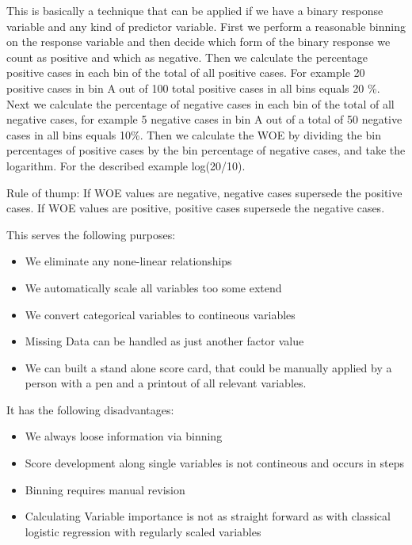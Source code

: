 \documentclass[
  letterpaper,
  DIV=11,
  numbers=noendperiod]{scrreprt}
\providecommand{\tightlist}{%
  \setlength{\itemsep}{0pt}\setlength{\parskip}{0pt}}\usepackage{longtable,booktabs,array}
\begin{document}
This is basically a technique that can be applied if we have a binary
response variable and any kind of predictor variable. First we perform a
reasonable binning on the response variable and then decide which form
of the binary response we count as positive and which as negative. Then
we calculate the percentage positive cases in each bin of the total of
all positive cases. For example 20 positive cases in bin A out of 100
total positive cases in all bins equals 20 \%. Next we calculate the
percentage of negative cases in each bin of the total of all negative
cases, for example 5 negative cases in bin A out of a total of 50
negative cases in all bins equals 10\%. Then we calculate the WOE by
dividing the bin percentages of positive cases by the bin percentage of
negative cases, and take the logarithm. For the described example
log(20/10).

Rule of thump: If WOE values are negative, negative cases supersede the
positive cases. If WOE values are positive, positive cases supersede the
negative cases.

This serves the following purposes:

\begin{itemize}
\tightlist
\item
  We eliminate any none-linear relationships
\item
  We automatically scale all variables too some extend
\item
  We convert categorical variables to contineous variables
\item
  Missing Data can be handled as just another factor value
\item
  We can built a stand alone score card, that could be manually applied
  by a person with a pen and a printout of all relevant variables.
\end{itemize}

It has the following disadvantages:

\begin{itemize}
\tightlist
\item
  We always loose information via binning
\item
  Score development along single variables is not contineous and occurs
  in steps
\item
  Binning requires manual revision
\item
  Calculating Variable importance is not as straight forward as with
  classical logistic regression with regularly scaled variables
\end{itemize}
\end{document}
